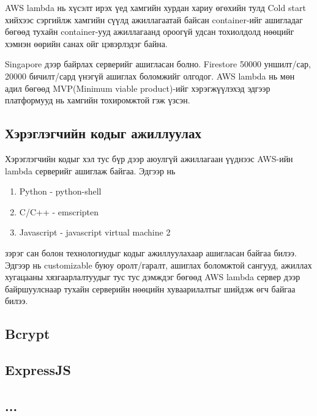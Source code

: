 AWS lambda нь хүсэлт ирэх үед хамгийн хурдан хариу өгөхийн тулд Cold start\footnotemark{}  хийхээс сэргийлж хамгийн сүүлд ажиллагаатай байсан container-ийг ашигладаг бөгөөд тухайн container-ууд ажиллагаанд ороогүй удсан тохиолдолд нөөцийг хэмнэн өөрийн санах ойг цэвэрлэдэг байна. 

Singapore дээр байрлах серверийг ашигласан болно. Firestore 50000 уншилт/сар, 20000 бичилт/сард үнэгүй ашиглах боломжийг олгодог. AWS lambda нь мөн адил бөгөөд MVP(Minimum viable product)-ийг хэрэгжүүлэхэд эдгээр платформууд нь хамгийн тохиромжтой гэж үзсэн.

\subsection{Хэрэглэгчийн кодыг ажиллуулах}
Хэрэглэгчийн кодыг хэл тус бүр дээр аюулгүй ажиллагаан үүднээс AWS-ийн lambda серверийг ашиглаж байгаа. Эдгээр нь
\begin{enumerate}
  \item Python - python-shell
  \item C/C++ - emscripten
  \item Javascript - javascript virtual machine 2
\end{enumerate}
зэрэг сан болон технологиудыг кодыг ажиллуулахаар ашигласан байгаа билээ. Эдгээр нь customizable буюу оролт/гаралт, ашиглах боломжтой сангууд, ажиллах хугацааны хязгаарлалтуудыг тус тус дэмждэг бөгөөд AWS lambda сервер дээр байршуулснаар тухайн серверийн нөөцийн хуваарилалтыг шийдэж өгч байгаа билээ. 

\subsection{Bcrypt}
\subsection{ExpressJS}
\subsection{...}